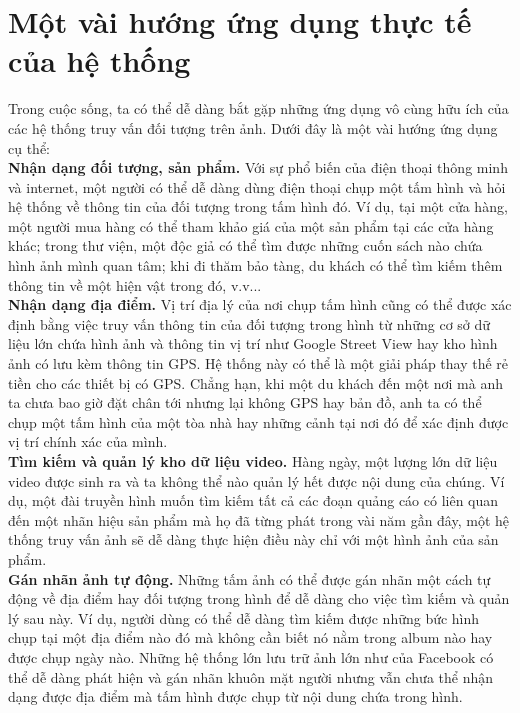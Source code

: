 \section{Một vài hướng ứng dụng thực tế của hệ thống}

Trong cuộc sống, ta có thể dễ dàng bắt gặp những ứng dụng vô cùng hữu ích của các hệ thống truy vấn đối tượng trên ảnh. Dưới đây là một vài hướng ứng dụng cụ thể:\\
\textbf{Nhận dạng đối tượng, sản phẩm.} Với sự phổ biến của điện thoại thông minh và internet, một người có thể dễ dàng dùng điện thoại chụp một tấm hình và hỏi hệ thống về thông tin của đối tượng trong tấm hình đó. Ví dụ, tại một cửa hàng, một người mua hàng có thể tham khảo giá của một sản phẩm tại các cửa hàng khác; trong thư viện, một độc giả có thể tìm được những cuốn sách nào chứa hình ảnh mình quan tâm; khi đi thăm bảo tàng, du khách có thể tìm kiếm thêm thông tin về một hiện vật trong đó, v.v...\\
\textbf{Nhận dạng địa điểm.} Vị trí địa lý của nơi chụp tấm hình cũng có thể được xác định bằng việc truy vấn thông tin của đối tượng trong hình từ những cơ sở dữ liệu lớn chứa hình ảnh và thông tin vị trí như Google Street View hay kho hình ảnh có lưu kèm thông tin GPS. Hệ thống này có thể là một giải pháp thay thế rẻ tiền cho các thiết bị có GPS. Chẳng hạn, khi một du khách đến một nơi mà anh ta chưa bao giờ đặt chân tới nhưng lại không GPS hay bản đồ, anh ta có thể chụp một tấm hình của một tòa nhà hay những cảnh tại nơi đó để xác định được vị trí chính xác của mình.\\
\textbf{Tìm kiếm và quản lý kho dữ liệu video.} Hàng ngày, một lượng lớn dữ liệu video được sinh ra và ta không thể nào quản lý hết được nội dung của chúng. Ví dụ, một đài truyền hình muốn tìm kiếm tất cả các đoạn quảng cáo có liên quan đến một nhãn hiệu sản phẩm mà họ đã từng phát trong vài năm gần đây, một hệ thống truy vấn ảnh sẽ dễ dàng thực hiện điều này chỉ với một hình ảnh của sản phẩm.\\
\textbf{Gán nhãn ảnh tự động.} Những tấm ảnh có thể được gán nhãn một cách tự động về địa điểm hay đối tượng trong hình để dễ dàng cho việc tìm kiếm và quản lý sau này. Ví dụ, người dùng có thể dễ dàng tìm kiếm được những bức hình chụp tại một địa điểm nào đó mà không cần biết nó nằm trong album nào hay được chụp ngày nào. Những hệ thống lớn lưu trữ ảnh lớn như của Facebook có thể dễ dàng phát hiện và gán nhãn khuôn mặt người nhưng vẫn chưa thể nhận dạng được địa điểm mà tấm hình được chụp từ nội dung chứa trong hình.\\
